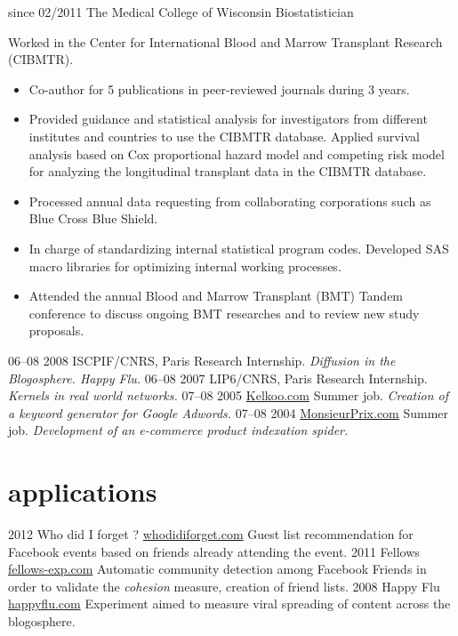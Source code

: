 \documentclass[]{friggeri-cv}
\begin{document}
\begin{entrylist}
  \entry
    {since 02/2011}
    {The Medical College of Wisconsin}
    {Biostatistician}
    {Worked in the Center for International Blood and Marrow Transplant Research (CIBMTR).
    \begin{itemize}
        \item Co-author for 5 publications in peer-reviewed journals during 3 years.
        \item Provided guidance and statistical analysis for investigators from different institutes and countries to use the CIBMTR database. Applied survival analysis based on Cox proportional hazard model and competing risk model for analyzing the longitudinal transplant data in the CIBMTR database.
        \item Processed annual data requesting from collaborating corporations such as Blue Cross Blue Shield.
        \item In charge of standardizing internal statistical program codes. Developed SAS macro libraries for optimizing internal working processes.
        \item Attended the annual Blood and Marrow Transplant (BMT) Tandem conference to discuss ongoing BMT researches and to review new study proposals.
    \end{itemize}
    }
  \entry
    {06–08 2008}
    {ISCPIF/CNRS, Paris}
    {Research Internship.}
    {\emph{Diffusion in the Blogosphere. Happy Flu.}}
  \entry
    {06–08 2007}
    {LIP6/CNRS, Paris}
    {Research Internship.}
    {\emph{Kernels in real world networks.}}
  \entry
    {07–08 2005}
    {\href{http://www.kelkoo.com}{Kelkoo.com}}
    {Summer job.}
    {\emph{Creation of a keyword generator for Google Adwords.}}
  \entry
    {07–08 2004}
    {\href{http://www.monsieurprix.com}{MonsieurPrix.com}}
    {Summer job.}
    {\emph{Development of an e-commerce product indexation spider.}}
\end{entrylist}

\section{applications}

\begin{entrylist}
  \entry
    {2012}
    {Who did I forget ?}
    {\href{http://whodidiforget.com}{whodidiforget.com}}
    {Guest list recommendation for Facebook events based on friends already attending the event.}
  \entry
    {2011}
    {Fellows}
    {\href{http://fellows-exp.com}{fellows-exp.com}}
    {Automatic community detection among Facebook Friends in order to validate the \emph{cohesion} measure, creation of friend lists.}
  \entry
    {2008}
    {Happy Flu}
    {\href{http://happyflu.com}{happyflu.com}}
    {Experiment aimed to measure viral spreading of content across the blogosphere.}
\end{entrylist}
\end{document}
